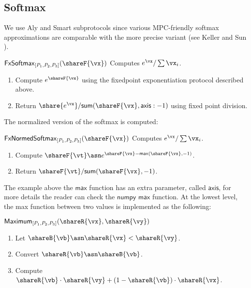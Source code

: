 \subsection{Softmax}
\label{subsec:softmax}

We use Aly and Smart subprotocols since various MPC-friendly softmax
approximations are comparable with the more precise variant (see Keller and Sun
\cite{keller2021effectiveness}).

\msubsubsection
  {$\mathsf{FxSoftmax}_{[P_1, P_2, P_3]}(\shareF{\vx})$}
  Computes $e^\vx / \sum \vx_i$.
\begin{enumerate}
    \item Compute $e^\shareF{\vx}$ using the fixedpoint exponentiation protocol described above.
    \item Return $\share{e^\vx} / \mathsf{sum}(\shareF{\vx}, \mathsf{axis}:-1)$ using fixed point division.
\end{enumerate}

The normalized version of the softmax is computed:

\msubsubsection
  {$\mathsf{FxNormedSoftmax}_{[P_1, P_2, P_3]}(\shareF{\vx})$}
  Computes $e^\vx / \sum \vx_i$.
\begin{enumerate}
    \item Compute  $\shareF{\vt} \asn e^{\shareF{\vx} -\mathsf{max}(\shareF{\vx}, -1)}$.
    \item Return $\shareF{\vt} / \mathsf{sum}(\shareF{\vx}, -1)$.
\end{enumerate}


The example above the $\mathsf{max}$ function has an extra parameter, called $\mathsf{axis}$,
for more details the reader can check the $\mathsf{numpy}$ $\mathsf{max}$ function.
At the lowest level, the max function between two values is implemented as the
following:


\msubsubsection
  {$\mathsf{Maximum}_{[P_1, P_2, P_3]}(\shareR{\vx}, \shareR{\vy})$}
\begin{enumerate}
    \item Let $\shareB{\vb} \asn \shareR{\vx} < \shareR{\vy}$.
    \item Convert $\shareR{\vb} \asn \shareB{\vb}$.
    \item Compute $\shareR{\vb} \cdot \shareR{\vy} + (1 - \shareR{\vb}) \cdot \shareR{\vx}$.
\end{enumerate}



